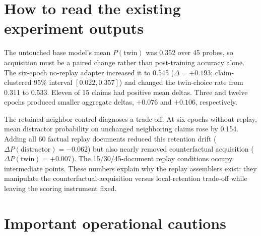 \documentclass[11pt]{article}
\begin{document}
\section{How to read the existing experiment outputs}

The untouched base model's mean $P(\mathrm{twin})$ was 0.352 over 45 probes,
so acquisition must be a paired change rather than post-training accuracy alone.
The six-epoch no-replay adapter increased it to 0.545
($\Delta=+0.193$; claim-clustered 95\% interval $[0.022,0.357]$) and changed the
twin-choice rate from 0.311 to 0.533.  Eleven of 15 claims had positive mean
deltas.  Three and twelve epochs produced smaller aggregate deltas, $+0.076$
and $+0.106$, respectively.

The retained-neighbor control diagnoses a trade-off.  At six epochs without
replay, mean distractor probability on unchanged neighboring claims rose by
0.154.  Adding all 60 factual replay documents reduced this retention drift
($\Delta P(\mathrm{distractor})=-0.062$) but also nearly removed counterfactual
acquisition ($\Delta P(\mathrm{twin})=+0.007$).  The 15/30/45-document replay
conditions occupy intermediate points.  These numbers explain why the replay
assemblers exist: they manipulate the counterfactual-acquisition versus
local-retention trade-off while leaving the scoring instrument fixed.

\section{Important operational cautions}
\end{document}
